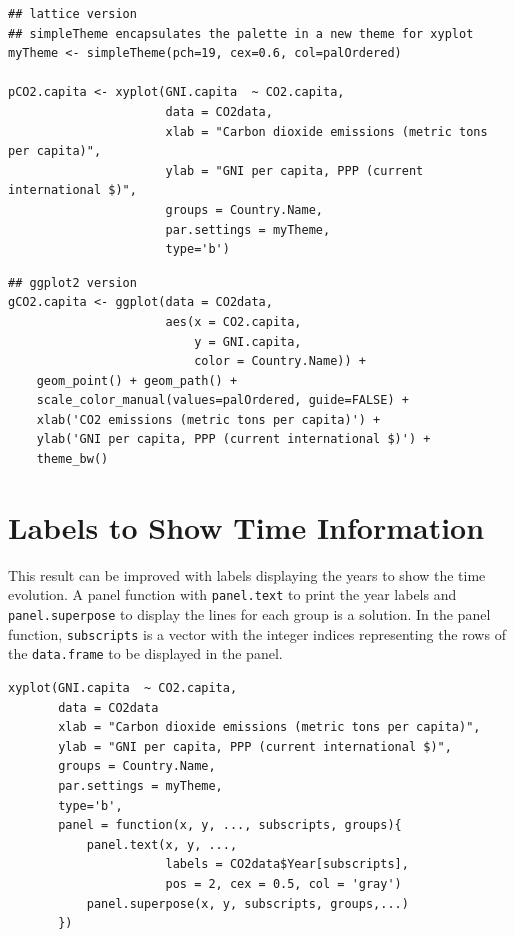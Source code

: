 \documentclass[smallroyalvopaper]{memoir}
\begin{document}
\lstset{language=r,label= ,caption= ,captionpos=b,numbers=none}
\begin{lstlisting}
## lattice version
## simpleTheme encapsulates the palette in a new theme for xyplot
myTheme <- simpleTheme(pch=19, cex=0.6, col=palOrdered)

pCO2.capita <- xyplot(GNI.capita  ~ CO2.capita,
                      data = CO2data,
                      xlab = "Carbon dioxide emissions (metric tons per capita)",
                      ylab = "GNI per capita, PPP (current international $)",
                      groups = Country.Name,
                      par.settings = myTheme,
                      type='b')
\end{lstlisting}

\lstset{language=r,label= ,caption= ,captionpos=b,numbers=none}
\begin{lstlisting}
## ggplot2 version
gCO2.capita <- ggplot(data = CO2data,
                      aes(x = CO2.capita,
                          y = GNI.capita,
                          color = Country.Name)) +
    geom_point() + geom_path() +
    scale_color_manual(values=palOrdered, guide=FALSE) +
    xlab('CO2 emissions (metric tons per capita)') +
    ylab('GNI per capita, PPP (current international $)') +
    theme_bw()
\end{lstlisting}

\section{Labels to Show Time Information}
\label{sec:org8b19cae}
This result can be improved with labels displaying the years to show
the time evolution.  A panel function with \texttt{panel.text} to print the
year labels and \texttt{panel.superpose} to display the lines for each group
is a solution. In the panel function, \texttt{subscripts} is a vector with
the integer indices representing the rows of the \texttt{data.frame} to be
displayed in the panel.



\lstset{language=r,label= ,caption= ,captionpos=b,numbers=none}
\begin{lstlisting}
xyplot(GNI.capita  ~ CO2.capita,
       data = CO2data
       xlab = "Carbon dioxide emissions (metric tons per capita)",
       ylab = "GNI per capita, PPP (current international $)",
       groups = Country.Name,
       par.settings = myTheme,
       type='b',
       panel = function(x, y, ..., subscripts, groups){
           panel.text(x, y, ...,
                      labels = CO2data$Year[subscripts],
                      pos = 2, cex = 0.5, col = 'gray')
           panel.superpose(x, y, subscripts, groups,...)
       })
\end{lstlisting}
\end{document}
